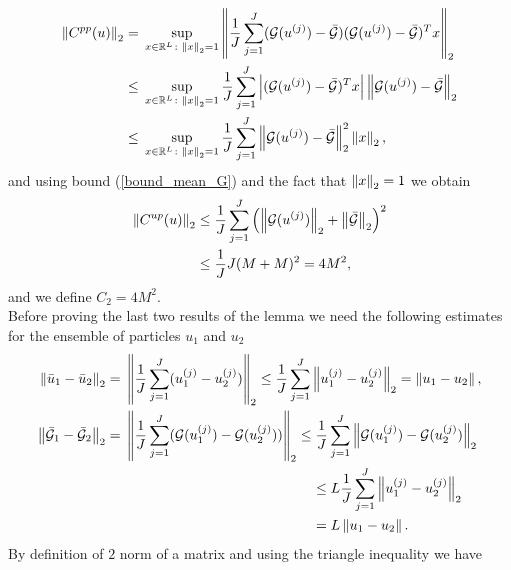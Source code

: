 \begin{align*}
\left\|C^{pp}(u)\right\|_2 = & \; \sup_{x \in \mathbb{R}^L \colon \left\|x\right\|_2 = 1} \left \lVert \frac{1}{J} \sum_{j=1}^J (\mathcal{G}(u^{(j)}) - \bar{\mathcal{G}}) (\mathcal{G}(u^{(j)}) - \bar{\mathcal{G}})^T x \right \rVert_2 \\
\le & \; \sup_{x \in \mathbb{R}^L \colon \left\|x\right\|_2 = 1} \frac{1}{J} \sum_{j=1}^J \left | (\mathcal{G}(u^{(j)}) - \bar{\mathcal{G}})^T x \right | \left \lVert \mathcal{G}(u^{(j)}) - \bar{\mathcal{G}} \right \rVert_2 \\
\le & \; \sup_{x \in \mathbb{R}^L \colon \left\|x\right\|_2 = 1} \frac{1}{J} \sum_{j=1}^J \left \lVert \mathcal{G}(u^{(j)}) - \bar{\mathcal{G}} \right \rVert^2_2 \left\|x\right\|_2,
\end{align*}
and using bound (\ref{bound_mean_G}) and the fact that $\left\|x\right\|_2 = 1$ we obtain
\begin{align*}
\left\|C^{up}(u)\right\|_2 \le & \; \frac{1}{J} \sum_{j=1}^J \left ( \left\|\mathcal{G}(u^{(j)})\right\|_2 + \left\|\bar{\mathcal{G}}\right\|_2 \right )^2 \\
\le & \; \frac{1}{J} J (M + M)^2 = 4M^2,
\end{align*}
and we define $C_2 = 4M^2$. \\
Before proving the last two results of the lemma we need the following estimates for the ensemble of particles $u_1$ and $u_2$
\begin{align*}
\norm{\bar{u}_1 - \bar{u}_2}_2 = & \; \left \lVert \frac{1}{J} \sum_{j=1}^J (u_1^{(j)} - u_2^{(j)}) \right \rVert_2 \le \frac{1}{J} \sum_{j=1}^J \norm{u_1^{(j)} - u_2^{(j)}}_2 = \norm{u_1 - u_2}, \\
\norm{\bar{\mathcal{G}}_1 - \bar{\mathcal{G}}_2}_2 = & \; \left \lVert \frac{1}{J} \sum_{j=1}^J (\mathcal{G}(u_1^{(j)}) - \mathcal{G}(u_2^{(j)})) \right \rVert_2 \le \frac{1}{J} \sum_{j=1}^J \norm{\mathcal{G}(u_1^{(j)}) - \mathcal{G}(u_2^{(j)})}_2 \\
& \hspace{137pt} \le L \frac{1}{J} \sum_{j=1}^J \norm{u_1^{(j)} - u_2^{(j)}}_2 \\
& \hspace{137pt} = L \norm{u_1 - u_2}.
\end{align*}
By definition of $2$ norm of a matrix and using the triangle inequality we have

